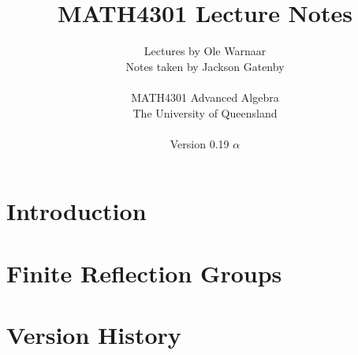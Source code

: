 \documentclass[a4paper]{report}
\title{MATH4301 Lecture Notes}
\author{Lectures by Ole Warnaar\\
Notes taken by Jackson Gatenby\\
\\
MATH4301 Advanced Algebra\\
The University of Queensland\\
\\
Version 0.19 $\alpha$}
\begin{document}
\maketitle
\tableofcontents



\chapter{Introduction}







\chapter{Finite Reflection Groups}

















\appendix

\chapter{Version History}

\end{document}
